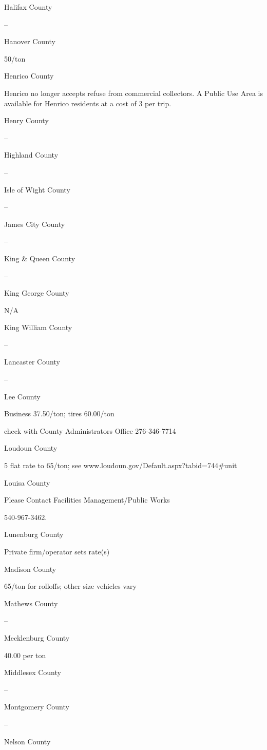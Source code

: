 \documentclass[
]{book}
\begin{document}
Halifax County

--

Hanover County

50/ton

Henrico County

Henrico no longer accepts refuse from commercial collectors. A Public Use Area is available for Henrico residents at a cost of 3 per trip.

Henry County

--

Highland County

--

Isle of Wight County

--

James City County

--

King \& Queen County

--

King George County

N/A

King William County

--

Lancaster County

--

Lee County

Business 37.50/ton; tires 60.00/ton

check with County Administrators Office 276-346-7714

Loudoun County

5 flat rate to 65/ton; see www.loudoun.gov/Default.aspx?tabid=744\#unit

Louisa County

Please Contact Facilities Management/Public Works

540-967-3462.

Lunenburg County

Private firm/operator sets rate(s)

Madison County

65/ton for rolloffs; other size vehicles vary

Mathews County

--

Mecklenburg County

40.00 per ton

Middlesex County

--

Montgomery County

--

Nelson County
\end{document}
